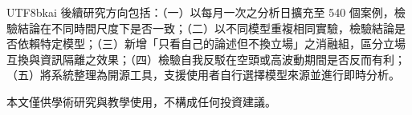 \documentclass[12pt,a4paper]{article}
\begin{document}
\begin{CJK}{UTF8}{bkai}
後續研究方向包括：（一）以每月一次之分析日擴充至 540 個案例，檢驗結論在不同時間尺度下是否一致；（二）以不同模型重複相同實驗，檢驗結論是否依賴特定模型；（三）新增「只看自己的論述但不換立場」之消融組，區分立場互換與資訊隔離之效果；（四）檢驗自我反駁在空頭或高波動期間是否反而有利；（五）將系統整理為開源工具，支援使用者自行選擇模型來源並進行即時分析。

\enlargethispage{\baselineskip}
\vspace{0.15cm}
\noindent\small 本文僅供學術研究與教學使用，不構成任何投資建議。
\normalsize

\clearpage



\end{CJK}
\end{document}
